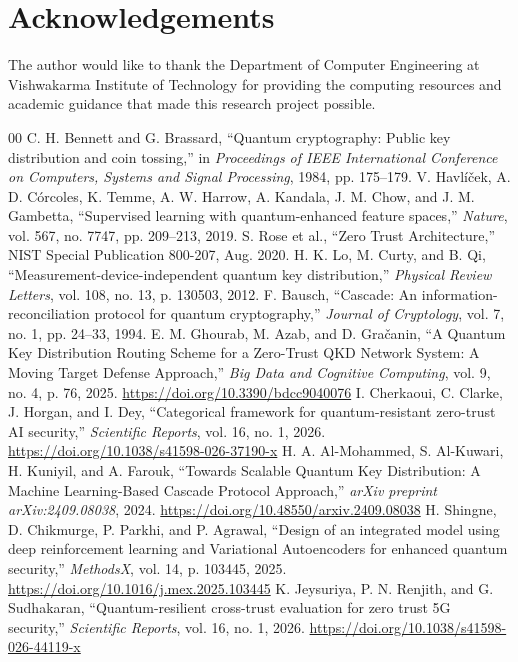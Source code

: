\documentclass[conference]{IEEEtran}
\begin{document}
\section*{Acknowledgements}
The author would like to thank the Department of Computer Engineering at Vishwakarma Institute of Technology for providing the computing resources and academic guidance that made this research project possible.

\begin{thebibliography}{00}
 C. H. Bennett and G. Brassard, ``Quantum cryptography: Public key distribution and coin tossing,'' in \textit{Proceedings of IEEE International Conference on Computers, Systems and Signal Processing}, 1984, pp. 175--179.
 V. Havl{\'i}\v{c}ek, A. D. C{\'o}rcoles, K. Temme, A. W. Harrow, A. Kandala, J. M. Chow, and J. M. Gambetta, ``Supervised learning with quantum-enhanced feature spaces,'' \textit{Nature}, vol. 567, no. 7747, pp. 209--213, 2019.
 S. Rose et al., ``Zero Trust Architecture,'' NIST Special Publication 800-207, Aug. 2020.
 H. K. Lo, M. Curty, and B. Qi, ``Measurement-device-independent quantum key distribution,'' \textit{Physical Review Letters}, vol. 108, no. 13, p. 130503, 2012.
 F. Bausch, ``Cascade: An information-reconciliation protocol for quantum cryptography,'' \textit{Journal of Cryptology}, vol. 7, no. 1, pp. 24--33, 1994.
 E. M. Ghourab, M. Azab, and D. Gra\v{c}anin, ``A Quantum Key Distribution Routing Scheme for a Zero-Trust QKD Network System: A Moving Target Defense Approach,'' \textit{Big Data and Cognitive Computing}, vol. 9, no. 4, p. 76, 2025. \url{https://doi.org/10.3390/bdcc9040076}
 I. Cherkaoui, C. Clarke, J. Horgan, and I. Dey, ``Categorical framework for quantum-resistant zero-trust AI security,'' \textit{Scientific Reports}, vol. 16, no. 1, 2026. \url{https://doi.org/10.1038/s41598-026-37190-x}
 H. A. Al-Mohammed, S. Al-Kuwari, H. Kuniyil, and A. Farouk, ``Towards Scalable Quantum Key Distribution: A Machine Learning-Based Cascade Protocol Approach,'' \textit{arXiv preprint arXiv:2409.08038}, 2024. \url{https://doi.org/10.48550/arxiv.2409.08038}
 H. Shingne, D. Chikmurge, P. Parkhi, and P. Agrawal, ``Design of an integrated model using deep reinforcement learning and Variational Autoencoders for enhanced quantum security,'' \textit{MethodsX}, vol. 14, p. 103445, 2025. \url{https://doi.org/10.1016/j.mex.2025.103445}
 K. Jeysuriya, P. N. Renjith, and G. Sudhakaran, ``Quantum-resilient cross-trust evaluation for zero trust 5G security,'' \textit{Scientific Reports}, vol. 16, no. 1, 2026. \url{https://doi.org/10.1038/s41598-026-44119-x}

\end{thebibliography}
\end{document}
